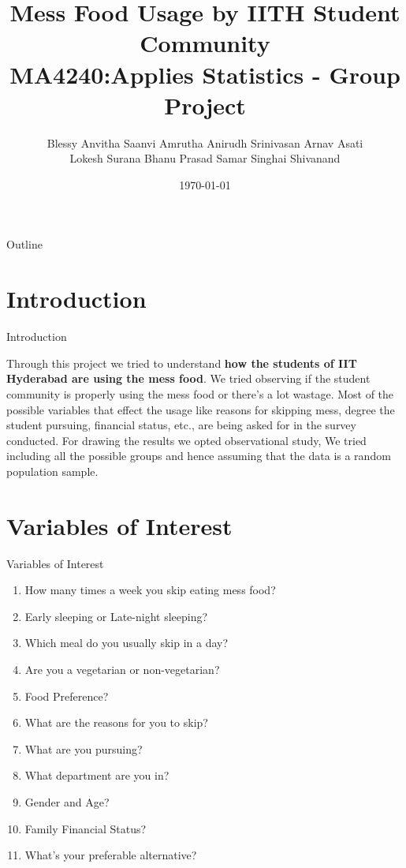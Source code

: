 \documentclass{beamer}
\title{\textbf{Mess Food Usage by IITH Student Community} \\
MA4240:Applies Statistics - Group Project}
\author{Blessy Anvitha \quad Saanvi Amrutha \quad Anirudh Srinivasan \quad Arnav Asati\\ Lokesh Surana \quad Bhanu Prasad \quad Samar Singhai \quad Shivanand}
\date{\today}
\begin{document}
\begin{frame}
    \titlepage 
\end{frame}

\logo{}
\author{}

\begin{frame}{Outline}
    \tableofcontents
\end{frame}

\section{Introduction}
\begin{frame}{Introduction}
\begin{block}{}
Through this project we tried to understand \textbf{how the students of IIT Hyderabad are using the mess food}. We tried observing if the student community is properly using the mess food or there's a lot wastage. Most of the possible variables that effect the usage like reasons for skipping mess, degree the student pursuing, financial status, etc., are being asked for in the survey conducted. For drawing the results we opted observational study, We tried including all the possible groups and hence assuming that the data is a random population sample.
\end{block}
\end{frame}

\section{Variables of Interest}
\begin{frame}{Variables of Interest}
\begin{block}{}
\begin{enumerate}
\item{How many times a week you skip eating mess food?}
\item{Early sleeping or Late-night sleeping?}
\item{Which meal do you usually skip in a day?}
\item{Are you a vegetarian or non-vegetarian?}
\item{Food Preference?}
\item{What are the reasons for you to skip?}
\item{What are you pursuing?}
\item{What department are you in?}
\item{Gender and Age?}
\item{Family Financial Status?}
\item{What's your preferable alternative?}
\end{enumerate}
\end{block}
\end{frame}
\end{document}
